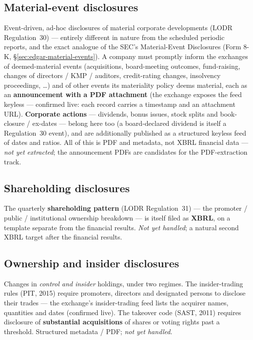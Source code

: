 \documentclass[11pt,a4paper]{report}
\begin{document}
\subsection{Material-event disclosures}\label{sec:india-material-events}
Event-driven, ad-hoc disclosures of material corporate developments (LODR Regulation~30) --- entirely
different in nature from the scheduled periodic reports, and the exact analogue of the SEC's Material-Event
Disclosures (Form 8-K, \S\ref{sec:edgar-material-events}). A company must promptly inform the exchanges of
deemed-material events (acquisitions, board-meeting outcomes, fund-raising, changes of directors / KMP /
auditors, credit-rating changes, insolvency proceedings, \ldots) and of other events its materiality policy
deems material, each as an \textbf{announcement with a PDF attachment} (the exchange exposes the feed keyless
--- confirmed live: each record carries a timestamp and an attachment URL). \textbf{Corporate actions} ---
dividends, bonus issues, stock splits and book-closure / ex-dates --- belong here too (a board-declared
dividend is itself a Regulation~30 event), and are additionally published as a structured keyless feed of
dates and ratios. All of this is PDF and metadata, not XBRL financial data --- \emph{not yet extracted}; the
announcement PDFs are candidates for the PDF-extraction track.

\subsection{Shareholding disclosures}\label{sec:india-shareholding}
The quarterly \textbf{shareholding pattern} (LODR Regulation~31) --- the promoter / public / institutional
ownership breakdown --- is itself filed as \textbf{XBRL}, on a template separate from the financial results.
\emph{Not yet handled}; a natural second XBRL target after the financial results.

\subsection{Ownership and insider disclosures}\label{sec:india-ownership}
Changes in \emph{control and insider} holdings, under two regimes. The insider-trading rules (PIT, 2015)
require promoters, directors and designated persons to disclose their trades --- the exchange's
insider-trading feed lists the acquirer names, quantities and dates (confirmed live). The takeover code
(SAST, 2011) requires disclosure of \textbf{substantial acquisitions} of shares or voting rights past a
threshold. Structured metadata / PDF; \emph{not yet handled}.
\end{document}
